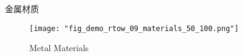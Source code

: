 金属材质

\begin{figure}[H]
    \texttt{[image: "fig\_demo\_rtow\_09\_materials\_50\_100.png"]}
    \caption{Metal Materials}
\end{figure}








